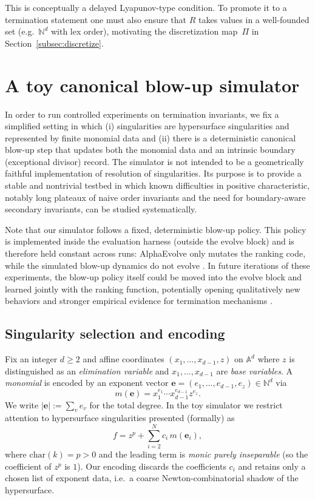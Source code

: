 \documentclass[11pt]{amsart}
\begin{document}
This is conceptually a delayed Lyapunov-type condition.  To promote it to a termination statement one must
also ensure that $R$ takes values in a well-founded set (e.g.\ $\mathbb{N}^d$ with lex order), motivating
the discretization map~$\Pi$ in Section~\ref{subsec:discretize}.

\section{A toy canonical blow-up simulator}
\label{sec:setup}

In order to run controlled experiments on termination invariants, we fix a simplified setting in which
(i) singularities are hypersurface singularities and represented by finite monomial data 
and (ii) there is a deterministic canonical blow-up step that updates both the monomial data and an
intrinsic boundary (exceptional divisor) record.
The simulator is not intended to be a geometrically faithful implementation of resolution of singularities.
Its purpose is to provide a stable and nontrivial testbed in which known difficulties in positive
characteristic, notably long plateaux of naive order invariants and the need for boundary-aware secondary
invariants, can be studied systematically.

Note that our simulator follows a fixed, deterministic blow-up policy. This policy is implemented inside the
evaluation harness (outside the evolve block) and is therefore held constant across runs: AlphaEvolve
only mutates the ranking code, while the simulated blow-up dynamics do not evolve \cite{NovikovEtAl2025AlphaEvolve}.
In future iterations of these experiments, the blow-up policy itself could be moved into the evolve
block and learned jointly with the ranking function, potentially opening qualitatively new behaviors
and stronger empirical evidence for termination mechanisms \cite{NovikovEtAl2025AlphaEvolve}.


\subsection{Singularity selection and encoding}
Fix an integer $d\ge 2$ and affine coordinates $(x_1,\dots,x_{d-1},z)$ on $\mathbb{A}^d$
where $z$ is distinguished as an \emph{elimination variable} and $x_1,\dots,x_{d-1}$ are \emph{base variables}.
A \emph{monomial} is encoded by an exponent vector
$\mathbf{e}=(e_1,\dots,e_{d-1},e_z)\in \mathbb{N}^d$ via
\[
m(\mathbf{e}) = x_1^{e_1}\cdots x_{d-1}^{e_{d-1}} z^{e_z}.
\]
We write $|\mathbf{e}|:=\sum_v e_v$ for the total degree. In the toy simulator we restrict attention to hypersurface singularities presented (formally)
as
\begin{equation}\label{hypersurface}
f = z^p + \sum_{i=2}^N c_i\, m(\mathbf{e}_i),
\end{equation}
where $\mathrm{char}(k)=p>0$ and the leading term is \emph{monic purely inseparable} (so the coefficient of
$z^p$ is $1$).  Our encoding discards the coefficients $c_i$ and retains only a chosen list of exponent data,
i.e.\ a coarse Newton-combinatorial shadow of the hypersurface.
\end{document}
